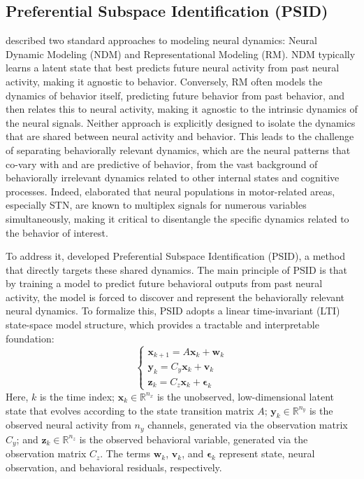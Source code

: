 \documentclass[12pt, a4paper]{article}
\begin{document}
\subsection{Preferential Subspace Identification (PSID)}
\textcite{saniModelingBehaviorallyRelevant2021} described two standard approaches to modeling neural dynamics: Neural Dynamic Modeling (NDM) and Representational Modeling (RM). NDM typically learns a latent state that best predicts future neural activity from past neural activity, making it agnostic to behavior. Conversely, RM often models the dynamics of behavior itself, predicting future behavior from past behavior, and then relates this to neural activity, making it agnostic to the intrinsic dynamics of the neural signals. Neither approach is explicitly designed to isolate the dynamics that are shared between neural activity and behavior. This leads to the challenge of separating behaviorally relevant dynamics, which are the neural patterns that co-vary with and are predictive of behavior, from the vast background of behaviorally irrelevant dynamics related to other internal states and cognitive processes. Indeed, \textcite{wuMixedSelectivitySubthalamic2025} elaborated that neural populations in motor-related areas, especially STN, are known to multiplex signals for numerous variables simultaneously, making it critical to disentangle the specific dynamics related to the behavior of interest.


To address it, \textcite{saniModelingBehaviorallyRelevant2021} developed Preferential Subspace Identification (PSID), a method that directly targets these shared dynamics. The main principle of PSID is that by training a model to predict future behavioral outputs from past neural activity, the model is forced to discover and represent the behaviorally relevant neural dynamics. To formalize this, PSID adopts a linear time-invariant (LTI) state-space model structure, which provides a tractable and interpretable foundation:
\[
    \begin{cases}
        \mathbf{x}_{k+1} = A \mathbf{x}_k + \mathbf{w}_k \\
        \mathbf{y}_k = C_y \mathbf{x}_k + \mathbf{v}_k   \\
        \mathbf{z}_k = C_z \mathbf{x}_k + \boldsymbol{\epsilon}_k
    \end{cases}
\]
Here, $k$ is the time index; $\mathbf{x}_k \in \mathbb{R}^{n_x}$ is the unobserved, low-dimensional latent state that evolves according to the state transition matrix $A$; $\mathbf{y}_k \in \mathbb{R}^{n_y}$ is the observed neural activity from $n_y$ channels, generated via the observation matrix $C_y$; and $\mathbf{z}_k \in \mathbb{R}^{n_z}$ is the observed behavioral variable, generated via the observation matrix $C_z$. The terms $\mathbf{w}_k$, $\mathbf{v}_k$, and $\boldsymbol{\epsilon}_k$ represent state, neural observation, and behavioral residuals, respectively.
\end{document}
